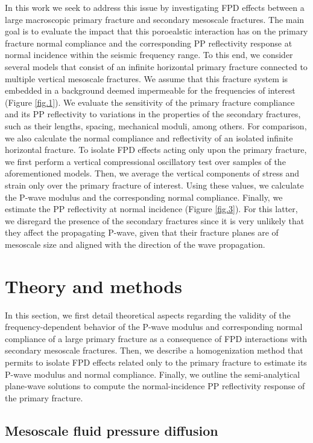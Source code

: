 \documentclass[draft]{agujournal2019}
\begin{document}
In this work we seek to address this issue by investigating  FPD effects between a large macroscopic primary fracture and secondary mesoscale fractures. The main goal is to evaluate the impact that this poroealstic interaction has on the primary fracture normal compliance and the corresponding PP reflectivity response at normal incidence within the seismic frequency range. To this end, we consider several models that consist of an infinite horizontal primary fracture connected to multiple vertical mesoscale fractures. We assume that this fracture system is embedded in a background deemed impermeable for the frequencies of interest (Figure \ref{fig.1}). We evaluate the sensitivity of the primary fracture compliance and its PP reflectivity to variations in the properties of the secondary fractures, such as  their lengths, spacing, mechanical moduli, among others. For comparison, we also calculate the normal compliance and reflectivity of an isolated infinite horizontal fracture. To isolate FPD effects acting only upon the primary fracture, we first perform a vertical compressional oscillatory test over samples of the aforementioned models. Then, we average the vertical components of stress and strain only over the primary fracture of interest. Using these values, we calculate the P-wave modulus and the corresponding normal compliance. Finally, we estimate the PP reflectivity at normal incidence (Figure \ref{fig.3}). For this latter, we disregard the presence of the secondary fractures since it is very unlikely that they affect the propagating P-wave, given that their fracture planes are of mesoscale size and aligned with the direction of the wave propagation.

\section{Theory and methods}
In this section, we first detail theoretical aspects regarding the validity of the frequency-dependent behavior of the P-wave modulus and corresponding normal compliance of a large primary fracture as a  consequence of FPD interactions with secondary mesoscale fractures. Then, we describe a homogenization method that permits to isolate FPD effects related only to the primary fracture to estimate its P-wave modulus and normal compliance. Finally, we outline the semi-analytical plane-wave solutions to compute the normal-incidence PP reflectivity response of the primary fracture.

\subsection{Mesoscale fluid pressure diffusion}
\end{document}
